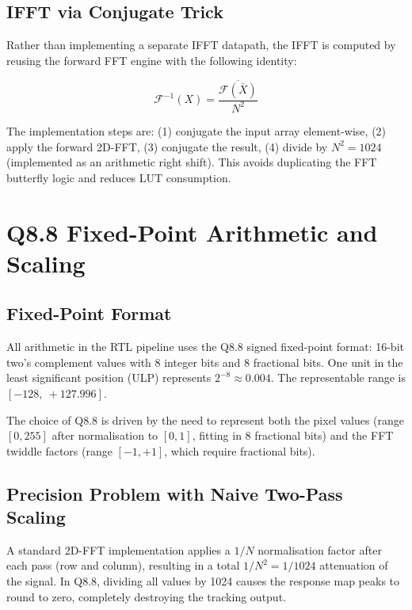\documentclass[a4paper,12pt]{report}
\begin{document}
\subsection{IFFT via Conjugate Trick}\label{sec:ifft}

Rather than implementing a separate IFFT datapath, the IFFT is computed by reusing the forward FFT engine with the following identity:

\begin{equation}\label{eq:ifft_trick}
\mathcal{F}^{-1}(X) = \frac{\overline{\mathcal{F}(\bar{X})}}{N^2}
\end{equation}

\noindent The implementation steps are: (1) conjugate the input array element-wise, (2) apply the forward 2D-FFT, (3) conjugate the result, (4) divide by $N^2 = 1024$ (implemented as an arithmetic right shift). This avoids duplicating the FFT butterfly logic and reduces LUT consumption.

\section{Q8.8 Fixed-Point Arithmetic and Scaling}

\subsection{Fixed-Point Format}

All arithmetic in the RTL pipeline uses the Q8.8 signed fixed-point format: 16-bit two's complement values with 8 integer bits and 8 fractional bits. One unit in the least significant position (ULP) represents $2^{-8} \approx 0.004$. The representable range is $[-128,\ +127.996]$.

\par The choice of Q8.8 is driven by the need to represent both the pixel values (range $[0, 255]$ after normalisation to $[0, 1]$, fitting in 8 fractional bits) and the FFT twiddle factors (range $[-1, +1]$, which require fractional bits).

\subsection{Precision Problem with Naive Two-Pass Scaling}

A standard 2D-FFT implementation applies a $1/N$ normalisation factor after each pass (row and column), resulting in a total $1/N^2 = 1/1024$ attenuation of the signal. In Q8.8, dividing all values by 1024 causes the response map peaks to round to zero, completely destroying the tracking output.
\end{document}
